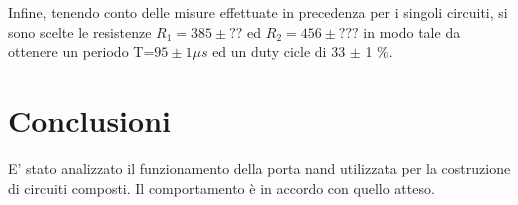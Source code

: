  Infine, tenendo conto delle misure effettuate in precedenza per i singoli circuiti, si sono scelte le resistenze $R_{1}=385 \pm ??$ ed $R_{2}=456 \pm ???$ in modo tale da ottenere un periodo T=$95 \pm 1 \mu s$ ed un duty cicle di 33 $\pm$ 1 \%.
 
 \section{Conclusioni}
 E' stato analizzato il funzionamento della porta nand utilizzata per la costruzione di circuiti composti. Il comportamento è in accordo con quello atteso.
